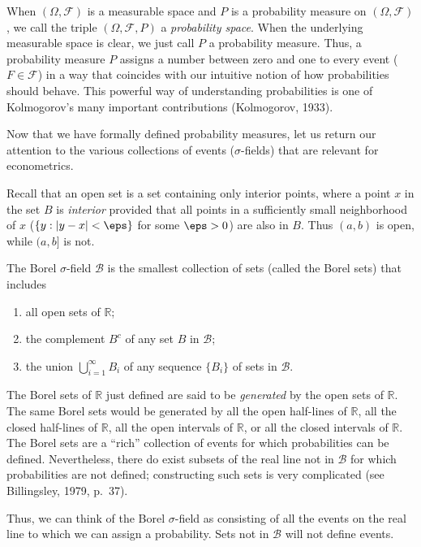 When $(\Omega, \mathcal{F})$ is a measurable space and $P$ is a probability measure on $(\Omega, \mathcal{F})$, we call the triple $(\Omega, \mathcal{F}, P)$ a \emph{probability space}. When the underlying measurable space is clear, we just call $P$ a probability measure. Thus, a probability measure $P$ assigns a number between zero and one to every event ($F \in \mathcal{F}$) in a way that coincides with our intuitive notion of how probabilities should behave. This powerful way of understanding probabilities is one of Kolmogorov's many important contributions (Kolmogorov, 1933).

Now that we have formally defined probability measures, let us return our attention to the various collections of events ($\sigma$-fields) that are relevant for econometrics.

Recall that an open set is a set containing only interior points, where a point $x$ in the set $B$ is \emph{interior} provided that all points in a sufficiently small neighborhood of $x$ ($\{y : |y - x| < \eps\}$ for some $\eps > 0$) are also in $B$. Thus $(a, b)$ is open, while $(a, b]$ is not.

\begin{definition}\label{def:borel-sigma-field}
The Borel $\sigma$-field $\mathcal{B}$ is the smallest collection of sets (called the Borel sets) that includes
\begin{enumerate}[label=(\roman*)]
\item all open sets of $\mathbb{R}$;
\item the complement $B^c$ of any set $B$ in $\mathcal{B}$;
\item the union $\bigcup_{i=1}^{\infty} B_i$ of any sequence $\{B_i\}$ of sets in $\mathcal{B}$.
\end{enumerate}
\end{definition}

The Borel sets of $\mathbb{R}$ just defined are said to be \emph{generated} by the open sets of $\mathbb{R}$. The same Borel sets would be generated by all the open half-lines of $\mathbb{R}$, all the closed half-lines of $\mathbb{R}$, all the open intervals of $\mathbb{R}$, or all the closed intervals of $\mathbb{R}$. The Borel sets are a ``rich'' collection of events for which probabilities can be defined. Nevertheless, there do exist subsets of the real line not in $\mathcal{B}$ for which probabilities are not defined; constructing such sets is very complicated (see Billingsley, 1979, p.~37).

Thus, we can think of the Borel $\sigma$-field as consisting of all the events on the real line to which we can assign a probability. Sets not in $\mathcal{B}$ will not define events.

